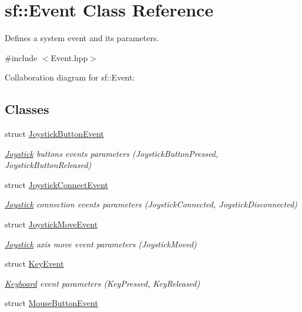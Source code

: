 \hypertarget{classsf_1_1_event}{}\section{sf\+:\+:Event Class Reference}
\label{classsf_1_1_event}


Defines a system event and its parameters.  




{\ttfamily \#include $<$Event.\+hpp$>$}



Collaboration diagram for sf\+:\+:Event\+:
\subsection*{Classes}
\begin{DoxyCompactItemize}
\item 
struct \hyperlink{structsf_1_1_event_1_1_joystick_button_event}{Joystick\+Button\+Event}
\begin{DoxyCompactList}\small\item\em \hyperlink{classsf_1_1_joystick}{Joystick} buttons events parameters (Joystick\+Button\+Pressed, Joystick\+Button\+Released) \end{DoxyCompactList}\item 
struct \hyperlink{structsf_1_1_event_1_1_joystick_connect_event}{Joystick\+Connect\+Event}
\begin{DoxyCompactList}\small\item\em \hyperlink{classsf_1_1_joystick}{Joystick} connection events parameters (Joystick\+Connected, Joystick\+Disconnected) \end{DoxyCompactList}\item 
struct \hyperlink{structsf_1_1_event_1_1_joystick_move_event}{Joystick\+Move\+Event}
\begin{DoxyCompactList}\small\item\em \hyperlink{classsf_1_1_joystick}{Joystick} axis move event parameters (Joystick\+Moved) \end{DoxyCompactList}\item 
struct \hyperlink{structsf_1_1_event_1_1_key_event}{Key\+Event}
\begin{DoxyCompactList}\small\item\em \hyperlink{classsf_1_1_keyboard}{Keyboard} event parameters (Key\+Pressed, Key\+Released) \end{DoxyCompactList}\item 
struct \hyperlink{structsf_1_1_event_1_1_mouse_button_event}{Mouse\+Button\+Event}

\end{DoxyCompactItemize}
